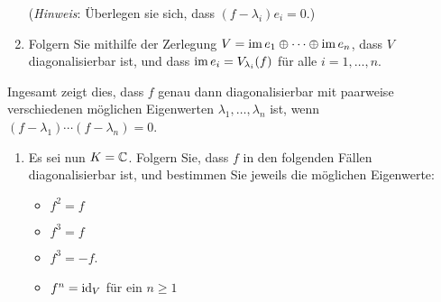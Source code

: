 \begin{question}
\begin{enumerate}[resume]
      (\emph{Hinweis}:
       Überlegen sie sich, dass $(f - \lambda_i) e_i = 0$.)
    \item
      Folgern Sie mithilfe der Zerlegung $V = \operatorname{im} e_1 \oplus \dotsb \oplus \operatorname{im} e_n$, dass $V$ diagonalisierbar ist, und dass $\operatorname{im} e_i = V_{\lambda_i}(f)$ für alle $i = 1, \dotsc, n$.
  \end{enumerate}
  Ingesamt zeigt dies, dass $f$ genau dann diagonalisierbar mit paarweise verschiedenen möglichen Eigenwerten $\lambda_1, \dotsc, \lambda_n$ ist, wenn $(f - \lambda_1) \dotsm (f - \lambda_n) = 0$.
  \begin{enumerate}[resume]
    \item 
      Es sei nun $K = \mathbb{C}$.
      Folgern Sie, dass $f$ in den folgenden Fällen diagonalisierbar ist, und bestimmen Sie jeweils die möglichen Eigenwerte:
      \begin{itemize}
        \item
          $f^2 = f$
        \item
          $f^3 = f$
        \item
          $f^3 = -f$.
        \item
          $f^n = \operatorname{id}_V$ für ein $n \geq 1$
      \end{itemize}
  \end{enumerate}
\end{question}
